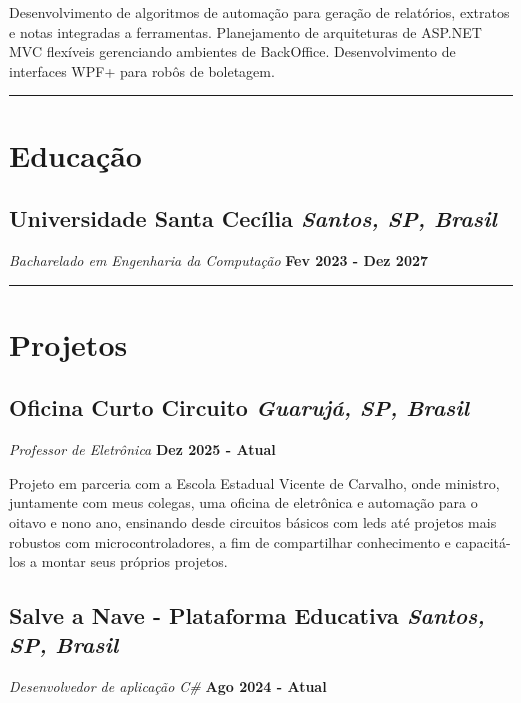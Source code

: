 \documentclass[a4paper,10pt]{article}
\newcommand{\sectionend}{
  \par\addvspace{0.75em}
  \hrule
  \addvspace{0.75em}
}
\newcommand{\company}[1]{{\bfseries #1}}
\newcommand{\place}[1]{{\itshape #1}}
\newcommand{\role}[1]{{\itshape\color{muted}#1}}
\newcommand{\daterange}[1]{{\small\bfseries\color{muted}#1}}
\begin{document}
    Desenvolvimento de algoritmos de automação para geração de relatórios, extratos e notas integradas a ferramentas. Planejamento de arquiteturas de ASP.NET MVC flexíveis gerenciando ambientes de BackOffice. Desenvolvimento de interfaces WPF+ para robôs de boletagem.


  

\sectionend


\section{Educação}

    \subsection*{\texorpdfstring{
      \company{Universidade Santa Cecília}
      \hfill
      \place{Santos, SP, Brasil}
    }{
      Universidade Santa Cecília -- Santos, SP, Brasil
    }}
    \par
    \role{Bacharelado em Engenharia da Computação}
    \hfill
    \daterange{Fev 2023 - Dez 2027}

    \sectionend

\section{Projetos}

    \subsection*{\texorpdfstring{
      \company{Oficina Curto Circuito}
      \hfill
      \place{Guarujá, SP, Brasil}
    }{
      Oficina Curto Circuito -- Guarujá, SP, Brasil
    }}
    \par
    \role{Professor de Eletrônica}
    \hfill
    \daterange{Dez 2025 - Atual}
        
    Projeto em parceria com a Escola Estadual Vicente de Carvalho, onde ministro, juntamente com meus colegas, 
    uma oficina de eletrônica e automação para o oitavo e nono ano, ensinando desde circuitos básicos com leds 
    até projetos mais robustos com microcontroladores, a fim de compartilhar conhecimento e capacitá-los a montar seus próprios projetos.

    \subsection*{\texorpdfstring{
    \company{Salve a Nave - Plataforma Educativa}
    \hfill
    \place{Santos, SP, Brasil}
    }{
      Salve a Nave - Plataforma Educativa -- Santos, SP, Brasil
    }}
    \par
    \role{Desenvolvedor de aplicação C\#}
    \hfill
    \daterange{Ago 2024 - Atual}
        
\end{document}
